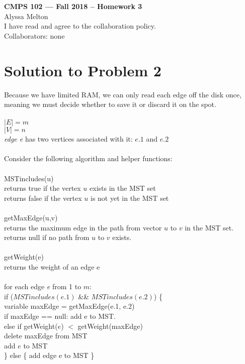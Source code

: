 \documentclass[11pt]{article}
\begin{document}
	
	\begin{center}
		{\bf\Large CMPS 102 --- Fall 2018 --  Homework 3}\\
		Alyssa Melton\\
		I have read and agree to the collaboration policy. \\
		Collaborators: none\\
	\end{center}
	
	
	\section*{Solution to Problem 2}
		Because we have limited RAM, we can only read each edge off the disk once, meaning we must decide whether to save it or discard it on the spot. \\
		\\
		$|E| = m$\\
		$|V| = n$\\
		\textit{edge e} has two vertices associated with it: $e.1$ and $e.2$\\
		\\
		Consider the following algorithm and helper functions:\\
		\\
		MSTincludes(u)\\
		\indent	returns true if the vertex $u$ exists in the MST set\\
		\indent	returns false if the vertex $u$ is not yet in the MST set\\
		\\
		getMaxEdge(u,v)\\
		\indent	returns the maximum edge in the path from vector $u$ to $v$ in the MST set.\\
		\indent	returns null if no path from $u$ to $v$ exists.\\
		\\	
		getWeight(e)\\
		\indent	returns the weight of an edge e\\
		\\	
		for each edge \textit{e} from 1 to $m$:\\
		\indent	if ($MSTincludes(e.1)$ \&\& $MSTincludes(e.2)$) \{\\
		\indent	\indent variable maxEdge = getMaxEdge(e.1, e.2)\\
		\indent	\indent if maxEdge == null: add e to MST.\\
		\indent \indent else if getWeight($e$) $<$  getWeight(maxEdge)\\
		\indent \indent	 \indent delete maxEdge from MST\\
		\indent \indent	 \indent add $e$ to MST\\
		\indent \} else \{ add edge e to MST \}\\
\end{document}
